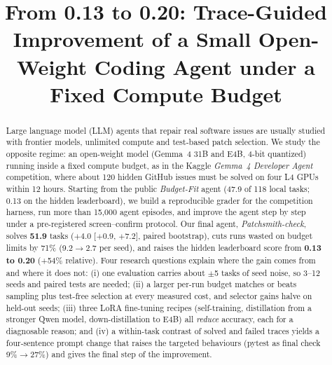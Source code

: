 \documentclass[conference]{IEEEtran}
\begin{document}
\title{From 0.13 to 0.20: Trace-Guided Improvement of a Small Open-Weight Coding Agent under a Fixed Compute Budget}

\author{
\and
{}
}

\maketitle

\begin{abstract}
Large language model (LLM) agents that repair real software issues are usually studied with frontier models, unlimited compute and test-based patch selection. We study the opposite regime: an open-weight model (Gemma~4 31B and E4B, 4-bit quantized) running inside a fixed compute budget, as in the Kaggle \emph{Gemma~4 Developer Agent} competition, where about 120 hidden GitHub issues must be solved on four L4 GPUs within 12 hours. Starting from the public \emph{Budget-Fit} agent (47.9 of 118 local tasks; 0.13 on the hidden leaderboard), we build a reproducible grader for the competition harness, run more than 15,000 agent episodes, and improve the agent step by step under a pre-registered screen--confirm protocol. Our final agent, \emph{Patchsmith-check}, solves \textbf{51.9} tasks ($+4.0$ [$+0.9$, $+7.2$], paired bootstrap), cuts runs wasted on budget limits by 71\% (9.2$\rightarrow$2.7 per seed), and raises the hidden leaderboard score from \textbf{0.13 to 0.20} (+54\% relative). Four research questions explain where the gain comes from and where it does not: (i) one evaluation carries about $\pm$5 tasks of seed noise, so 3--12 seeds and paired tests are needed; (ii) a larger per-run budget matches or beats sampling plus test-free selection at every measured cost, and selector gains halve on held-out seeds; (iii) three LoRA fine-tuning recipes (self-training, distillation from a stronger Qwen model, down-distillation to E4B) all \emph{reduce} accuracy, each for a diagnosable reason; and (iv) a within-task contrast of solved and failed traces yields a four-sentence prompt change that raises the targeted behaviours (pytest as final check 9\%$\rightarrow$27\%) and gives the final step of the improvement.
\end{abstract}
\end{document}
